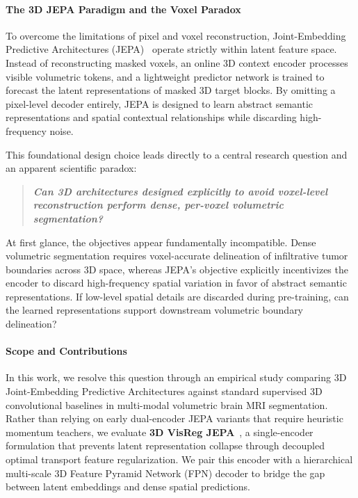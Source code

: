 \documentclass{article}
\begin{document}
\paragraph{The 3D JEPA Paradigm and the Voxel Paradox}
To overcome the limitations of pixel and voxel reconstruction, Joint-Embedding Predictive Architectures (JEPA)~\citep{assran2023ijepa,lecun2022path} operate strictly within latent feature space. Instead of reconstructing masked voxels, an online 3D context encoder processes visible volumetric tokens, and a lightweight predictor network is trained to forecast the latent representations of masked 3D target blocks. By omitting a pixel-level decoder entirely, JEPA is designed to learn abstract semantic representations and spatial contextual relationships while discarding high-frequency noise.

This foundational design choice leads directly to a central research question and an apparent scientific paradox:
\begin{quote}
\centering
\textbf{\emph{Can 3D architectures designed explicitly to avoid voxel-level reconstruction perform dense, per-voxel volumetric segmentation?}}
\end{quote}
At first glance, the objectives appear fundamentally incompatible. Dense volumetric segmentation requires voxel-accurate delineation of infiltrative tumor boundaries across 3D space, whereas JEPA's objective explicitly incentivizes the encoder to discard high-frequency spatial variation in favor of abstract semantic representations. If low-level spatial details are discarded during pre-training, can the learned representations support downstream volumetric boundary delineation?

\paragraph{Scope and Contributions}
In this work, we resolve this question through an empirical study comparing 3D Joint-Embedding Predictive Architectures against standard supervised 3D convolutional baselines in multi-modal volumetric brain MRI segmentation. Rather than relying on early dual-encoder JEPA variants that require heuristic momentum teachers, we evaluate \textbf{3D VisReg JEPA}~\citep{wu2026visreg}, a single-encoder formulation that prevents latent representation collapse through decoupled optimal transport feature regularization. We pair this encoder with a hierarchical multi-scale 3D Feature Pyramid Network (FPN) decoder to bridge the gap between latent embeddings and dense spatial predictions.
\end{document}
